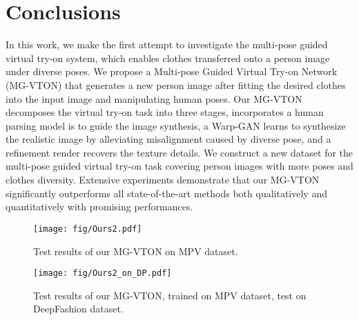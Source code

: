 \documentclass[10pt,twocolumn,letterpaper]{article}
\begin{document}
\section{Conclusions}
In this work, we make the first attempt to investigate the multi-pose guided virtual try-on system, which enables clothes transferred onto a person image under diverse poses. We propose a Multi-pose Guided Virtual Try-on Network (MG-VTON) that generates a new person image after fitting the desired clothes into the input image and manipulating human poses. Our MG-VTON decomposes the virtual try-on task into three stages, incorporates a human parsing model is to guide the image synthesis, a Warp-GAN learns to synthesize the realistic image by alleviating misalignment caused by diverse pose, and a refinement render recovers the texture details. We construct a new dataset for the multi-pose guided virtual try-on task covering person images with more poses and clothes diversity. Extensive experiments demonstrate that our MG-VTON significantly outperforms all state-of-the-art methods both qualitatively and quantitatively with promising performances.


{\small


}








\begin{figure*}[!h]
\centering
\texttt{[image: fig/Ours2.pdf]} 
\caption{Test results of our MG-VTON on MPV dataset.}
\label{fig:ours2}
\end{figure*}

\begin{figure*}[!h]
\centering
\texttt{[image: fig/Ours2\_on\_DP.pdf]} 
\caption{Test results of our MG-VTON, trained on MPV dataset, test on DeepFashion dataset.}
\label{fig:ours3}
\end{figure*}
\end{document}
